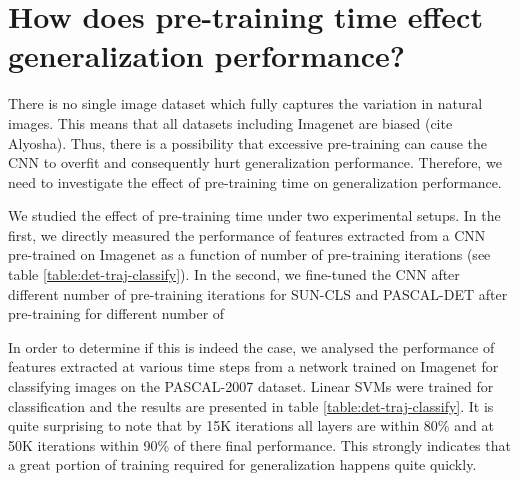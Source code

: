 \section{How does pre-training time effect generalization performance?}
\label{sec:speed}
There is no single image dataset which fully captures the variation in natural images. This means that all datasets including Imagenet are biased (cite Alyosha). Thus, there is a possibility that excessive pre-training can cause the CNN to overfit and consequently hurt generalization performance. Therefore, we need to investigate the effect of pre-training time on generalization performance.

We studied the effect of pre-training time under two experimental setups. In the first, we directly measured  the performance of features extracted from a CNN pre-trained on Imagenet as a function of number of pre-training iterations (see table \ref{table:det-traj-classify}). In the second, we fine-tuned the CNN after different number of pre-training iterations  for SUN-CLS and PASCAL-DET after pre-training for different number of 

In order to determine if this is indeed the case, we analysed the performance of features extracted  at various time steps from a network trained on Imagenet for classifying images on the PASCAL-2007 dataset. Linear SVMs were trained for classification and the results are presented in table \ref{table:det-traj-classify}. It is quite surprising to note that by 15K iterations all layers are within 80\% and at 50K iterations within 90\% of there final performance. This strongly indicates that a great portion of training required for generalization happens quite quickly. 


